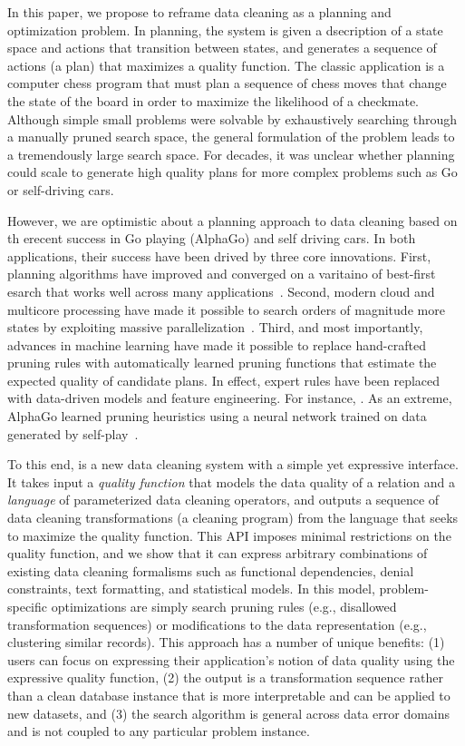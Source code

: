 In this paper, we propose to reframe data cleaning as a planning and optimization problem.  In planning, the system is given a dsecription of a state space and actions that transition between states, and generates a sequence of actions (a plan) that maximizes a quality function. The classic application is a computer chess program that must plan a sequence of chess moves that change the state of the board in order to maximize the likelihood of a checkmate. Although simple small problems were solvable by exhaustively searching through a manually pruned search space, the general formulation of the problem leads to a tremendously large search space.  For decades, it was unclear whether planning could scale to generate high quality plans for more complex problems such as Go or self-driving cars.

However, we are optimistic about a planning approach to data cleaning based on th erecent success in Go playing (AlphaGo) and self driving cars.  In both applications, their success have been drived by three core innovations.  First, planning algorithms have improved and converged on a varitaino of best-first esarch that works well across many applications~\cite{}.  Second, modern cloud and multicore processing have made it possible to search orders of magnitude more states by exploiting massive parallelization~\cite{}.  Third, and most importantly, advances in machine learning have made it possible to replace hand-crafted pruning rules with automatically learned pruning functions that estimate the expected quality of candidate plans.  In effect, expert rules have been replaced with data-driven models and feature engineering.  For instance, .  As an extreme, AlphaGo learned pruning heuristics using a neural network trained on data generated by self-play~\cite{alphago}.   

To this end, \sys is a new data cleaning system with a simple yet expressive interface.  It takes input a {\it quality function} that models the data quality of a relation and a {\it language} of parameterized data cleaning operators, and outputs a sequence of data cleaning transformations (a cleaning program) from the language that seeks to maximize the quality function.  This API imposes minimal restrictions on the quality function, and we show that it can express arbitrary combinations of existing data cleaning formalisms such as functional dependencies, denial constraints, text formatting, and statistical models.  In this model, problem-specific optimizations are simply search pruning rules (e.g., disallowed transformation sequences) or modifications to the data representation (e.g., clustering similar records).  This approach has a number of unique benefits: (1) users can focus on expressing their application's notion of data quality using the expressive quality function, (2) the output is a transformation sequence rather than a clean database instance that is more interpretable and can be applied to new datasets, and (3) the search algorithm is general across data error domains and is not coupled to any particular problem instance.

